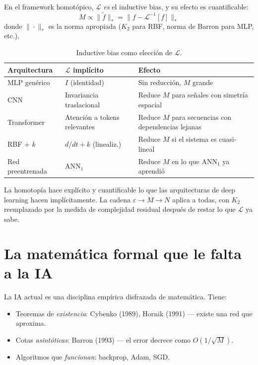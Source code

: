 \documentclass[11pt,a4paper]{article}
\begin{document}
En el framework homot\'opico, $\mathcal{L}$ \emph{es} el inductive bias, y su efecto es cuantificable:
\begin{equation}
M \propto \|\tilde{f}\|_* = \|f - \mathcal{L}^{-1}[f]\|_*
\end{equation}
donde $\|\cdot\|_*$ es la norma apropiada ($K_2$ para RBF, norma de Barron para MLP, etc.).

\begin{table}[H]
\centering
\caption{Inductive bias como elecci\'on de $\mathcal{L}$.}
\begin{tabular}{L{3cm} L{5cm} L{5cm}}
\toprule
\textbf{Arquitectura} & \textbf{$\mathcal{L}$ impl\'icito} & \textbf{Efecto} \\
\midrule
MLP gen\'erico & $I$ (identidad) & Sin reducci\'on, $M$ grande \\
CNN & Invariancia traslacional & Reduce $M$ para se\~nales con simetr\'ia espacial \\
Transformer & Atenci\'on a tokens relevantes & Reduce $M$ para secuencias con dependencias lejanas \\
RBF + $k$ & $d/dt + k$ (linealiz.) & Reduce $M$ si el sistema es cuasi-lineal \\
Red preentrenada & ANN$_1$ & Reduce $M$ en lo que ANN$_1$ ya aprendi\'o \\
\bottomrule
\end{tabular}
\end{table}

\begin{resultado}
La homotop\'ia hace expl\'icito y cuantificable lo que las arquitecturas de deep learning hacen impl\'icitamente. La cadena $\varepsilon \to M \to N$ aplica a todas, con $K_2$ reemplazado por la medida de complejidad residual despu\'es de restar lo que $\mathcal{L}$ ya sabe.
\end{resultado}


\section{La matem\'atica formal que le falta a la IA}

La IA actual es una disciplina emp\'irica disfrazada de matem\'atica. Tiene:
\begin{itemize}[nosep]
\item Teoremas de \emph{existencia}: Cybenko (1989), Hornik (1991) --- existe una red que aproxima.
\item Cotas \emph{asint\'oticas}: Barron (1993) --- el error decrece como $O(1/\sqrt{M})$.
\item Algoritmos que \emph{funcionan}: backprop, Adam, SGD.
\end{itemize}
\end{document}
